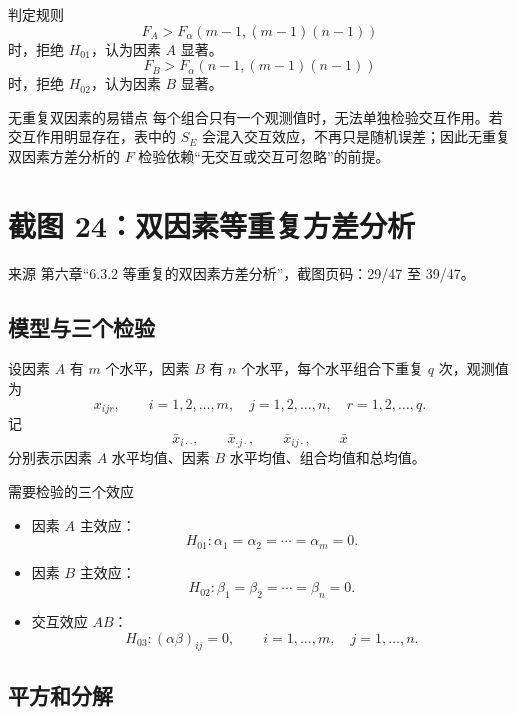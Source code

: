\documentclass[UTF8,zihao=-4,fontset=fandol]{ctexart}
\begin{document}
\begin{methodbox}{判定规则}
\[
F_A>F_{\alpha}(m-1,(m-1)(n-1))
\]
时，拒绝 $H_{01}$，认为因素 $A$ 显著。
\[
F_B>F_{\alpha}(n-1,(m-1)(n-1))
\]
时，拒绝 $H_{02}$，认为因素 $B$ 显著。
\end{methodbox}

\begin{warnbox}{无重复双因素的易错点}
每个组合只有一个观测值时，无法单独检验交互作用。若交互作用明显存在，表中的 $S_E$ 会混入交互效应，不再只是随机误差；因此无重复双因素方差分析的 $F$ 检验依赖“无交互或交互可忽略”的前提。
\end{warnbox}

\section{截图 24：双因素等重复方差分析}

\begin{sourcebox}{来源}
第六章“6.3.2 等重复的双因素方差分析”，截图页码：29/47 至 39/47。
\end{sourcebox}

\subsection{模型与三个检验}

设因素 $A$ 有 $m$ 个水平，因素 $B$ 有 $n$ 个水平，每个水平组合下重复 $q$ 次，观测值为
\[
x_{ijr},\qquad
i=1,2,\ldots,m,\quad j=1,2,\ldots,n,\quad r=1,2,\ldots,q.
\]
记
\[
\bar{x}_{i\cdot\cdot},\qquad
\bar{x}_{\cdot j\cdot},\qquad
\bar{x}_{ij\cdot},\qquad
\bar{x}
\]
分别表示因素 $A$ 水平均值、因素 $B$ 水平均值、组合均值和总均值。

\begin{keybox}{需要检验的三个效应}
\begin{itemize}
  \item 因素 $A$ 主效应：
  \[
  H_{01}:\alpha_1=\alpha_2=\cdots=\alpha_m=0.
  \]
  \item 因素 $B$ 主效应：
  \[
  H_{02}:\beta_1=\beta_2=\cdots=\beta_n=0.
  \]
  \item 交互效应 $AB$：
  \[
  H_{03}:(\alpha\beta)_{ij}=0,\qquad i=1,\ldots,m,\quad j=1,\ldots,n.
  \]
\end{itemize}
\end{keybox}

\subsection{平方和分解}
\end{document}
